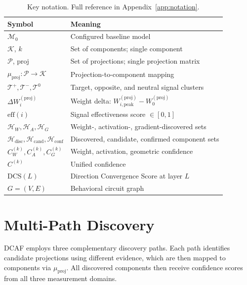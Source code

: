 \documentclass[11pt]{article}
\begin{document}
\begin{table}[h]
\centering
\small
\begin{tabular}{ll}
\toprule
\textbf{Symbol} & \textbf{Meaning} \\
\midrule
$\mathcal{M}_0$ & Configured baseline model \\
$\mathcal{K}$, $k$ & Set of components; single component \\
$\mathcal{P}$, $\text{proj}$ & Set of projections; single projection matrix \\
$\mu_{\text{proj}}: \mathcal{P} \to \mathcal{K}$ & Projection-to-component mapping \\
$\mathcal{T}^+, \mathcal{T}^-, \mathcal{T}^0$ & Target, opposite, and neutral signal clusters \\
$\Delta W_i^{(\text{proj})}$ & Weight delta: $W_{i,\text{peak}}^{(\text{proj})} - W_0^{(\text{proj})}$ \\
$\text{eff}(i)$ & Signal effectiveness score $\in [0,1]$ \\
$\mathcal{H}_W, \mathcal{H}_A, \mathcal{H}_G$ & Weight-, activation-, gradient-discovered sets \\
$\mathcal{H}_{\text{disc}}, \mathcal{H}_{\text{cand}}, \mathcal{H}_{\text{conf}}$ & Discovered, candidate, confirmed component sets \\
$C_W^{(k)}, C_A^{(k)}, C_G^{(k)}$ & Weight, activation, geometric confidence \\
$C^{(k)}$ & Unified confidence \\
$\text{DCS}(L)$ & Direction Convergence Score at layer $L$ \\
$G = (V, E)$ & Behavioral circuit graph \\
\bottomrule
\end{tabular}
\caption{Key notation. Full reference in Appendix~\ref{app:notation}.}
\label{tab:notation}
\end{table}


\section{Multi-Path Discovery}
\label{sec:discovery}

DCAF employs three complementary discovery paths. Each path identifies candidate projections using different evidence, which are then mapped to components via $\mu_{\text{proj}}$. All discovered components then receive confidence scores from all three measurement domains.
\end{document}
